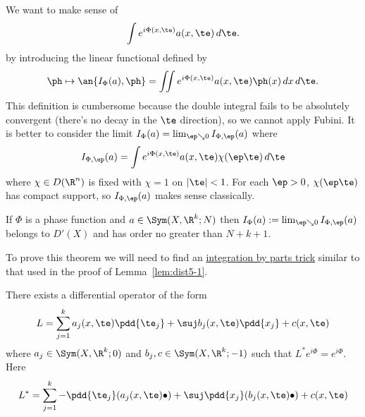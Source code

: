 We want to make sense of
\[
\int e^{i\Phi(x,\te)}a(x,\te)\,d\te.
\]
by introducing the linear functional defined by
\[
\ph\mapsto \an{I_{\Phi}(a),\ph}=\iint e^{i\Phi(x,\te)} a(x,\te)\ph(x)\,dx\,d\te.
\]
This definition is cumbersome because the double integral fails to be absolutely convergent (there's no decay in the $\te$ direction), so we cannot apply Fubini. It is better to consider the limit $I_{\Phi}(a)=\lim_{\ep\searrow 0} I_{\Phi,\ep}(a)$ where 
\[
I_{\Phi,\ep}(a)=\int e^{i\Phi(x,\te)} a(x,\te)\chi(\ep\te)\,d\te
\]
where $\chi\in D(\R^n)$ is fixed with $\chi=1$ on $|\te|<1$. For each $\ep>0$, $\chi(\ep\te)$ has compact support, so $I_{\Phi,\ep}(a)$ makes sense classically.
\begin{thm}
If $\Phi$ is a phase function and $a\in \Sym(X,\R^k;N)$ then $I_{\Phi}(a):=\lim_{\ep\searrow0} I_{\Phi,\ep}(a)$ belongs to $D'(X)$ and has order no greater than $N+k+1$.
\end{thm}
To prove this theorem we will need to find an  \hyperlink{cpt:ibp_for_oscillatory}{integration by parts trick} similar to that used in the proof of Lemma~\ref{lem:dist5-1}.
\begin{lem}
There exists a differential operator of the form
\[
L=\sum_{j=1}^k a_j(x,\te) \pdd{\te_j} +\suj b_j(x,\te)\pdd{x_j} +c(x,\te)
\]
where $a_j\in \Sym(X,\R^k;0)$ and $b_j,c\in \Sym(X,\R^k;-1)$ such that $L^*e^{i\Phi}=e^{i\Phi}$. Here
\[
L^*=\sum_{j=1}^k - \pdd{\te_j}(a_j(x,\te)\bullet) +\suj\pdd{x_j}( b_j(x,\te)\bullet) +c(x,\te)
\]
\end{lem}
